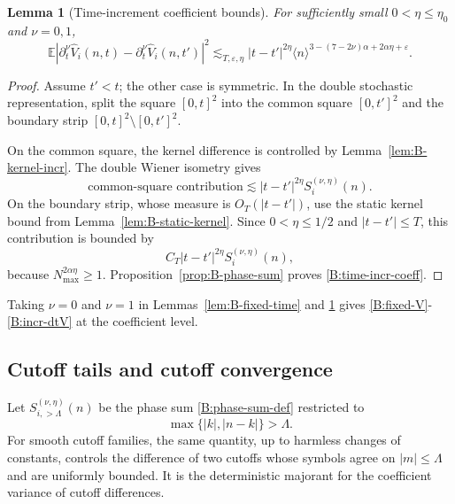 \documentclass[10pt]{amsart}
\numberwithin{equation}{section}
\theoremstyle{plain}
\newtheorem{lemma}[theorem]{Lemma}
\theoremstyle{definition}
\theoremstyle{remark}
\newcommand{\E}{\mathbb{E}}
\newcommand{\eps}{\varepsilon}
\newcommand{\la}{\langle}
\newcommand{\ra}{\rangle}
\begin{document}
\begin{lemma}[Time-increment coefficient bounds]\label{lem:B-time-increments}
For sufficiently small \(0<\eta\le\eta_0\) and \(\nu=0,1\),
\begin{equation}\label{B:time-incr-coeff}
        \E\left|\partial_t^\nu\widehat V_i(n,t)-\partial_t^\nu\widehat V_i(n,t')\right|^2
        \lesssim_{T,\eps,\eta}
        |t-t'|^{2\eta}
        \la n\ra^{3-(7-2\nu)\alpha+2\alpha\eta+\eps}.
\end{equation}
\end{lemma}

\begin{proof}
Assume \(t'<t\); the other case is symmetric.  In the double stochastic representation, split the square \([0,t]^2\) into the common square \([0,t']^2\) and the boundary strip \([0,t]^2\setminus[0,t']^2\).

On the common square, the kernel difference is controlled by Lemma~\ref{lem:B-kernel-incr}.  The double Wiener isometry gives
\[
        \text{common-square contribution}
        \lesssim
        |t-t'|^{2\eta}S_i^{(\nu,\eta)}(n).
\]
On the boundary strip, whose measure is \(O_T(|t-t'|)\), use the static kernel bound from Lemma~\ref{lem:B-static-kernel}.  Since \(0<\eta\le1/2\) and \(|t-t'|\le T\), this contribution is bounded by
\[
        C_T|t-t'|^{2\eta}S_i^{(\nu,\eta)}(n),
\]
because \(N_{\max}^{2\alpha\eta}\ge1\).  Proposition~\ref{prop:B-phase-sum} proves \eqref{B:time-incr-coeff}.
\end{proof}

Taking \(\nu=0\) and \(\nu=1\) in Lemmas~\ref{lem:B-fixed-time} and \ref{lem:B-time-increments} gives \eqref{B:fixed-V}-\eqref{B:incr-dtV} at the coefficient level.

\subsection{Cutoff tails and cutoff convergence}

Let \(S_{i,>\Lambda}^{(\nu,\eta)}(n)\) be the phase sum \eqref{B:phase-sum-def} restricted to
\[
        \max\{|k|,|n-k|\}>\Lambda.
\]
For smooth cutoff families, the same quantity, up to harmless changes of constants, controls the difference of two cutoffs whose symbols agree on \(|m|\le\Lambda\) and are uniformly bounded.  It is the deterministic majorant for the coefficient variance of cutoff differences.
\end{document}
